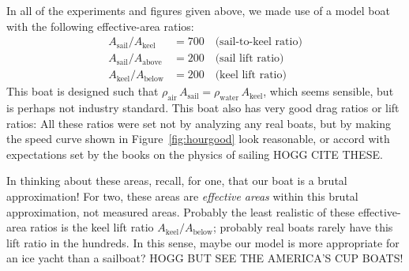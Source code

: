 \documentclass[letterpaper]{article}
\newcommand{\air}{\text{air}}
\newcommand{\water}{\text{water}}
\newcommand{\sail}{\text{sail}}
\newcommand{\keel}{\text{keel}}
\renewcommand{\above}{\text{above}}
\newcommand{\below}{\text{below}}
\newcommand{\figref}[1]{Figure~\ref{#1}}
\begin{document}
In all of the experiments and figures given above, we made use of a model boat with the following effective-area ratios:
\begin{align}
  A_\sail / A_\keel &= 700 \quad\mbox{(sail-to-keel ratio)}\label{eq:boat1}\\
  A_\sail / A_\above &= 200 \quad\mbox{(sail lift ratio)}\\
  A_\keel / A_\below &= 200 \quad\mbox{(keel lift ratio)}\label{eq:boat4}
\end{align}
This boat is designed such that $\rho_\air\,A_\sail = \rho_\water\,A_\keel$, which seems sensible, but is perhaps not industry standard.
This boat also has very good drag ratios or lift ratios:
All these ratios were set not by analyzing any real boats, but by making the speed curve shown in \figref{fig:hourgood} look reasonable, or accord with expectations set by the books on the physics of sailing HOGG CITE THESE.

In thinking about these areas, recall, for one, that our boat is a brutal approximation!
For two, these areas are \emph{effective areas} within this brutal approximation, not measured areas.
Probably the least realistic of these effective-area ratios is the keel lift ratio $A_\keel/A_\below$; probably real boats rarely have this lift ratio in the hundreds.
In this sense, maybe our model is more appropriate for an ice yacht than a sailboat?
HOGG BUT SEE THE AMERICA'S CUP BOATS!
\end{document}
